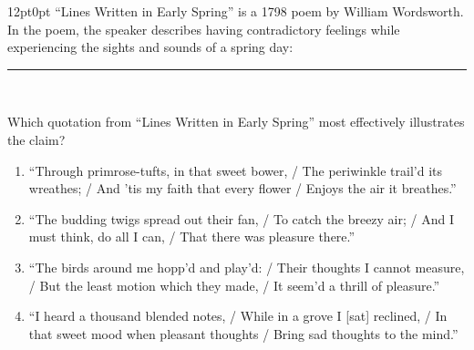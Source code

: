 \documentclass[11pt, twocolumn]{article}
\newcounter{questionnum}
\begin{document}
\vspace{6pt}\noindent
\begin{minipage}{\columnwidth}\raggedright
\noindent{}\par\vspace{8pt}
\begin{adjustwidth}{12pt}{0pt}
``Lines Written in Early Spring'' is a 1798 poem by William Wordsworth. In the poem, the speaker describes having contradictory feelings while experiencing the sights and sounds of a spring day: \,\rule{2cm}{0.4pt}\,
\vspace{6pt}

Which quotation from ``Lines Written in Early Spring'' most effectively illustrates the claim?
\begin{enumerate}[label=\Alph*),leftmargin=18pt,topsep=3pt,itemsep=2pt]
  \item ``Through primrose-tufts, in that sweet bower, / The periwinkle trail'd its wreathes; / And 'tis my faith that every flower / Enjoys the air it breathes.''
  \item ``The budding twigs spread out their fan, / To catch the breezy air; / And I must think, do all I can, / That there was pleasure there.''
  \item ``The birds around me hopp'd and play'd: / Their thoughts I cannot measure, / But the least motion which they made, / It seem'd a thrill of pleasure.''
  \item ``I heard a thousand blended notes, / While in a grove I [sat] reclined, / In that sweet mood when pleasant thoughts / Bring sad thoughts to the mind.''
\end{enumerate}
\end{adjustwidth}
\end{minipage}\par
\end{document}
